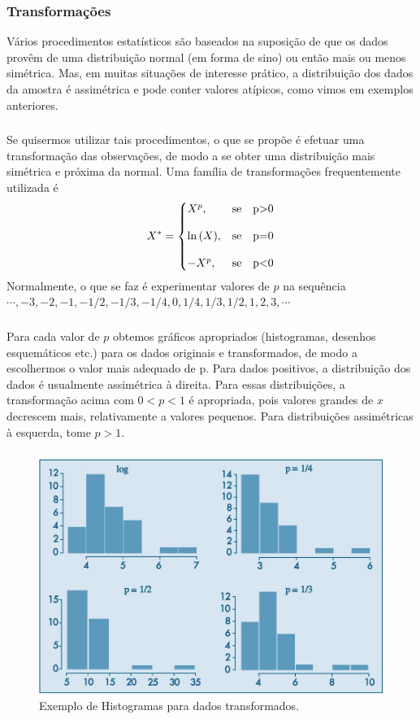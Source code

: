 \documentclass[14pt,aspectratio=1610]{beamer}
\begin{document}
\begin{frame}{}
\frametitle{Transformações}
\begin{block}{}
\justifying
Vários procedimentos estatísticos são baseados na suposição de que os dados provêm
de uma distribuição normal (em forma de sino) ou então mais ou menos simétrica.
Mas, em muitas situações de interesse prático, a distribuição dos dados da amostra
é assimétrica e pode conter valores atípicos, como vimos em exemplos anteriores.
\end{block}
\end{frame}

\begin{frame}{}
\frametitle{}
\begin{block}{}
\justifying
Se quisermos utilizar tais procedimentos, o que se propõe é efetuar uma transformação
das observações, de modo a se obter uma distribuição mais simétrica e próxima
da normal. Uma família de transformações frequentemente utilizada é
\[
X^{*}=\left\{
\setlength\arraycolsep{0pt}
\begin{array}{lr}
X^{p},                              &\quad \textrm{se}\quad $p>0$\\
&\\
\ln{(X)},                           &\quad \textrm{se}\quad $p=0$\\
&\\
-X^{p},                             &\quad \textrm{se}\quad $p<0$\\
\end{array}
\right.
\]
Normalmente, o que se faz é experimentar valores de $p$ na sequência 
$\cdots, -3, -2, -1, -1/2, -1/3, -1/4, 0, 1/4, 1/3, 1/2, 1, 2, 3,\cdots$
\end{block}
\end{frame}

\begin{frame}{}
\frametitle{}
\begin{block}{}
\justifying
Para cada valor de $p$ obtemos gráficos apropriados (histogramas, desenhos esquemáticos etc.)
para os dados originais e transformados, de modo a escolhermos o valor mais adequado de p. Para dados positivos, 
a distribuição dos dados é usualmente assimétrica à direita. Para essas distribuições, a transformação acima com 
$0 < p < 1$ é apropriada, pois valores grandes de $x$ decrescem mais, relativamente a valores pequenos. Para distribuições assimétricas à esquerda, tome $p > 1.$
\end{block}
\end{frame}

\begin{frame}{}
\frametitle{}
\begin{figure}[H]
    \centering
    \includegraphics[height=0.4\textwidth,width=15cm]{Fig11}
    \caption{Exemplo de Histogramas para dados transformados.}
    \label{Fig101_ex}
  \end{figure}
\end{frame}
\end{document}
